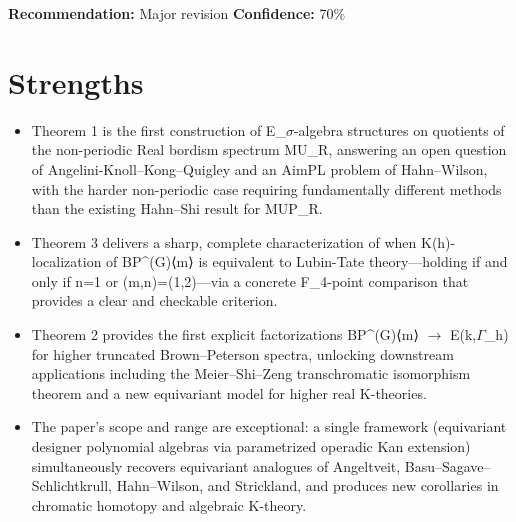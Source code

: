 \documentclass[11pt]{article}
\begin{document}
\textbf{Recommendation:} Major revision \quad \textbf{Confidence:} 70\%\\

\section*{Strengths}
\begin{itemize}[leftmargin=*]
  \item Theorem 1 is the first construction of E\_\ensuremath{\sigma}-algebra structures on quotients of the non-periodic Real bordism spectrum MU\_R, answering an open question of Angelini-Knoll--Kong--Quigley and an AimPL problem of Hahn--Wilson, with the harder non-periodic case requiring fundamentally different methods than the existing Hahn--Shi result for MUP\_R.
  \item Theorem 3 delivers a sharp, complete characterization of when K(h)-localization of BP\^{}(G)⟨m⟩ is equivalent to Lubin-Tate theory---holding if and only if n=1 or (m,n)=(1,2)---via a concrete F\_4-point comparison that provides a clear and checkable criterion.
  \item Theorem 2 provides the first explicit factorizations BP\^{}(G)⟨m⟩ \ensuremath{\to} E(k,\ensuremath{\Gamma}\_h) for higher truncated Brown--Peterson spectra, unlocking downstream applications including the Meier--Shi--Zeng transchromatic isomorphism theorem and a new equivariant model for higher real K-theories.
  \item The paper's scope and range are exceptional: a single framework (equivariant designer polynomial algebras via parametrized operadic Kan extension) simultaneously recovers equivariant analogues of Angeltveit, Basu--Sagave--Schlichtkrull, Hahn--Wilson, and Strickland, and produces new corollaries in chromatic homotopy and algebraic K-theory.
\end{itemize}
\end{document}
